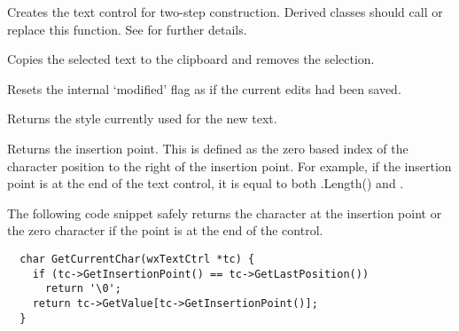 \label{wxtextctrlcreate}


Creates the text control for two-step construction. Derived classes
should call or replace this function. See \rtfsp
for further details.

\label{wxtextctrlcut}


Copies the selected text to the clipboard and removes the selection.



Resets the internal `modified' flag as if the current edits had been saved.

\label{wxtextctrlgetdefaultstyle}


Returns the style currently used for the new text.



\label{wxtextctrlgetinsertionpoint}


Returns the insertion point. This is defined as the zero based index of the
character position to the right of the insertion point. For example, if
the insertion point is at the end of the text control, it is equal to
both .Length() and
.

The following code snippet safely returns the character at the insertion
point or the zero character if the point is at the end of the control.

{\small%
\begin{verbatim}
  char GetCurrentChar(wxTextCtrl *tc) {
    if (tc->GetInsertionPoint() == tc->GetLastPosition())
      return '\0';
    return tc->GetValue[tc->GetInsertionPoint()];
  }
\end{verbatim}
}%

